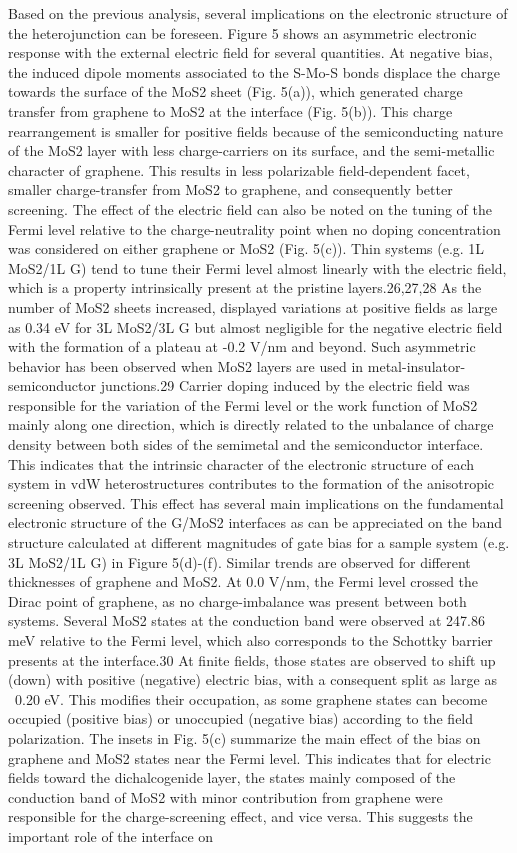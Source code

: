 Based on the previous analysis, several implications on the electronic structure of the heterojunction can be foreseen. Figure 5 shows an asymmetric electronic response with the external electric field for several quantities. At negative bias, the induced dipole moments associated to the S-Mo-S bonds displace the charge towards the surface of the MoS2 sheet (Fig. 5(a)), which generated charge transfer from graphene to MoS2 at the interface (Fig. 5(b)). This charge rearrangement is smaller for positive fields because of the semiconducting nature of the MoS2 layer with less charge-carriers on its surface, and the semi-metallic character of graphene. This results in less polarizable field-dependent facet, smaller charge-transfer from MoS2 to graphene, and consequently better screening. The effect of the electric field can also be noted on the tuning of the Fermi level   relative to the charge-neutrality point when no doping concentration was considered on either graphene or MoS2 (Fig. 5(c)). Thin systems (e.g. 1L MoS2/1L G) tend to tune their Fermi level almost linearly with the electric field, which is a property intrinsically present at the pristine layers.26,27,28 As the number of MoS2 sheets increased,   displayed variations at positive fields as large as 0.34 eV for 3L MoS2/3L G but almost negligible for the negative electric field with the formation of a plateau at -0.2 V/nm and beyond. Such asymmetric behavior has been observed when MoS2 layers are used in metal-insulator-semiconductor junctions.29 Carrier doping induced by the electric field was responsible for the variation of the Fermi level or the work function of MoS2 mainly along one direction, which is directly related to the unbalance of charge density between both sides of the semimetal and the semiconductor interface. This indicates that the intrinsic character of the electronic structure of each system in vdW heterostructures contributes to the formation of the anisotropic screening observed. This effect has several main implications on the fundamental electronic structure of the G/MoS2 interfaces as can be appreciated on the band structure calculated at different magnitudes of gate bias for a sample system (e.g. 3L MoS2/1L G) in Figure 5(d)-(f). Similar trends are observed for different thicknesses of graphene and MoS2. At 0.0 V/nm, the Fermi level crossed the Dirac point of graphene, as no charge-imbalance was present between both systems. Several MoS2 states at the conduction band were observed at 247.86 meV relative to the Fermi level, which also corresponds to the Schottky barrier presents at the interface.30 At finite fields, those states are observed to shift up (down) with positive (negative) electric bias, with a consequent split as large as ~0.20 eV. This modifies their occupation, as some graphene states can become occupied (positive bias) or unoccupied (negative bias) according to the field polarization. The insets in Fig. 5(c) summarize the main effect of the bias on graphene and MoS2 states near the Fermi level.  This indicates that for electric fields toward the dichalcogenide layer, the states mainly composed of the conduction band of MoS2 with minor contribution from graphene were responsible for the charge-screening effect, and vice versa. This suggests the important role of the interface on 
